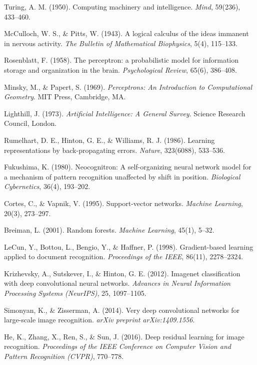 \documentclass[12pt,a4paper]{report}
\begin{document}
\begin{enumerate}[leftmargin=1.5cm, label={[\arabic*]}]
    \item Turing, A. M. (1950). Computing machinery and intelligence. \textit{Mind}, 59(236), 433--460.
    \item McCulloch, W. S., \& Pitts, W. (1943). A logical calculus of the ideas immanent in nervous activity. \textit{The Bulletin of Mathematical Biophysics}, 5(4), 115--133.
    \item Rosenblatt, F. (1958). The perceptron: a probabilistic model for information storage and organization in the brain. \textit{Psychological Review}, 65(6), 386--408.
    \item Minsky, M., \& Papert, S. (1969). \textit{Perceptrons: An Introduction to Computational Geometry}. MIT Press, Cambridge, MA.
    \item Lighthill, J. (1973). \textit{Artificial Intelligence: A General Survey}. Science Research Council, London.
    \item Rumelhart, D. E., Hinton, G. E., \& Williams, R. J. (1986). Learning representations by back-propagating errors. \textit{Nature}, 323(6088), 533--536.
    \item Fukushima, K. (1980). Neocognitron: A self-organizing neural network model for a mechanism of pattern recognition unaffected by shift in position. \textit{Biological Cybernetics}, 36(4), 193--202.
    \item Cortes, C., \& Vapnik, V. (1995). Support-vector networks. \textit{Machine Learning}, 20(3), 273--297.
    \item Breiman, L. (2001). Random forests. \textit{Machine Learning}, 45(1), 5--32.
    \item LeCun, Y., Bottou, L., Bengio, Y., \& Haffner, P. (1998). Gradient-based learning applied to document recognition. \textit{Proceedings of the IEEE}, 86(11), 2278--2324.
    \item Krizhevsky, A., Sutskever, I., \& Hinton, G. E. (2012). Imagenet classification with deep convolutional neural networks. \textit{Advances in Neural Information Processing Systems (NeurIPS)}, 25, 1097--1105.
    \item Simonyan, K., \& Zisserman, A. (2014). Very deep convolutional networks for large-scale image recognition. \textit{arXiv preprint arXiv:1409.1556}.
    \item He, K., Zhang, X., Ren, S., \& Sun, J. (2016). Deep residual learning for image recognition. \textit{Proceedings of the IEEE Conference on Computer Vision and Pattern Recognition (CVPR)}, 770--778.

\end{enumerate}
\end{document}
